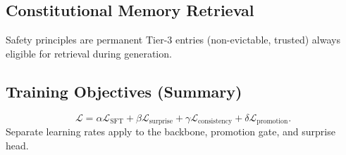 \subsection{Constitutional Memory Retrieval}


Safety principles are permanent Tier-3 entries (non-evictable, trusted)
always eligible for retrieval during generation.

\subsection{Training Objectives (Summary)}


\begin{equation}
  \mathcal{L} = \alpha \mathcal{L}_{\text{SFT}} + \beta \mathcal{L}_{\text{surprise}}
  + \gamma \mathcal{L}_{\text{consistency}} + \delta \mathcal{L}_{\text{promotion}}.
\end{equation}
Separate learning rates apply to the backbone, promotion gate, and surprise head.
